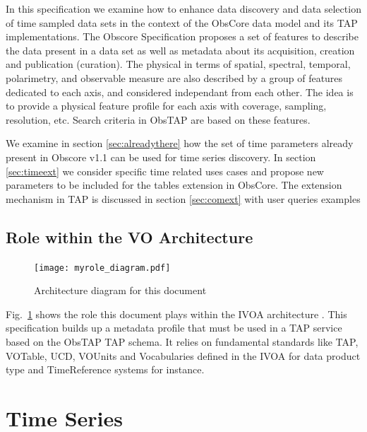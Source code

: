 \documentclass[11pt,a4paper]{ivoa}
\begin{document}
In this specification we examine how to enhance data discovery and data selection of time sampled data sets in the context of the ObsCore data model and its TAP implementations. 
The Obscore Specification \cite{2017ivoa.spec.0509L} proposes a set of features to describe the data present in a data set as well as metadata about its acquisition, creation and publication (curation).
The physical in terms of spatial, spectral, temporal, polarimetry, and observable measure  are also described by a group of features dedicated to each axis, and considered independant from each other. The idea is to provide a physical feature profile for each axis with coverage, sampling, resolution, etc. 
Search criteria in ObsTAP  are based on these features. 

We examine in section \ref{sec:alreadythere} how the set of time parameters already present in Obscore v1.1 can be used for time series discovery.
In section \ref{sec:timeext} we consider specific time related uses cases and propose new parameters to be included for the tables extension in ObsCore.
The extension mechanism in TAP is discussed  in section \ref{sec:comext} with user queries examples 

\subsection{Role within the VO Architecture}

\begin{figure}
\centering


\texttt{[image: myrole\_diagram.pdf]}
\caption{Architecture diagram for this document}
\label{fig:archdiag}
\end{figure}

Fig.~\ref{fig:archdiag} shows the role this document plays within the
IVOA architecture \citep{2021ivoa.spec.1101D}. This specification builds up a metadata profile that must be used in a TAP service based on the ObsTAP TAP schema. 
It relies on fundamental  standards like TAP, VOTable, UCD, VOUnits and Vocabularies defined in the IVOA  for data product type and TimeReference systems 
for instance.


\section{Time Series}
\label{sect:metadata}
\end{document}
